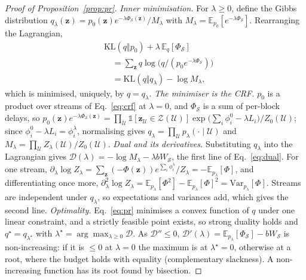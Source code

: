 \begin{proof}[Proof of Proposition~\ref{prop:pr}]
\emph{Inner minimisation.} For $\lambda\ge0$, define the Gibbs distribution
$q_\lambda(\bm{z})=p_0(\bm{z})e^{-\lambda\Phi_\mathcal{S}(\bm{z})}/M_\lambda$ with $M_\lambda=\mathbb{E}_{p_0}[e^{-\lambda\Phi_\mathcal{S}}]$.
Rearranging the Lagrangian,
\[
\begin{aligned}
&\mathrm{KL}(q\Vert p_0)+\lambda\,\mathbb{E}_q[\Phi_\mathcal{S}]\\
&\quad=\textstyle\sum_{\bm{z}}q\log\big(q/(p_0e^{-\lambda\Phi_\mathcal{S}})\big)\\
&\quad=\mathrm{KL}(q\Vert q_\lambda)-\log M_\lambda ,
\end{aligned}
\]
which is minimised, uniquely, by $q=q_\lambda$.
\emph{The minimiser is the CRF.} $p_0$ is a product over streams of Eq.~\eqref{eq:crf} at $\lambda=0$, and
$\Phi_\mathcal{S}$ is a sum of per-block delays, so
$p_0(\bm{z})e^{-\lambda\Phi_\mathcal{S}(\bm{z})}=\prod_{\mathcal{U}}\mathds{1}[\bm{z}_{\mathcal{U}}\in\mathcal{Z}(\mathcal{U})]\exp\big(\sum_i\phi^0_i-\lambda L_i\big)/Z_0(\mathcal{U})$;
since $\phi^0_i-\lambda L_i=\phi^\lambda_i$, normalising gives $q_\lambda=\prod_{\mathcal{U}}p_\lambda(\cdot\mid\mathcal{U})$ and
$M_\lambda=\prod_{\mathcal{U}}Z_\lambda(\mathcal{U})/Z_0(\mathcal{U})$.
\emph{Dual and its derivatives.} Substituting $q_\lambda$ into the Lagrangian gives
$\mathcal{D}(\lambda)=-\log M_\lambda-\lambda bW_\mathcal{S}$, the first line of Eq.~\eqref{eq:dual}. For one stream,
$\partial_\lambda\log Z_\lambda=\sum_{\bm{z}}(-\Phi(\bm{z}))e^{\sum_i\phi^\lambda_i}/Z_\lambda=-\mathbb{E}_{p_\lambda}[\Phi]$, and
differentiating once more, $\partial^2_\lambda\log Z_\lambda=\mathbb{E}_{p_\lambda}[\Phi^2]-\mathbb{E}_{p_\lambda}[\Phi]^2=\mathrm{Var}_{p_\lambda}[\Phi]$.
Streams are independent under $q_\lambda$, so expectations and variances add, which gives the second line.
\emph{Optimality.} Eq.~\eqref{eq:pr} minimises a convex function of $q$ under one linear constraint, and a strictly
feasible point exists, so strong duality holds and $q^\star=q_{\lambda^\star}$ with $\lambda^\star=\arg\max_{\lambda\ge0}\mathcal{D}$.
As $\mathcal{D}''\le0$, $\mathcal{D}'(\lambda)=\mathbb{E}_{p_\lambda}[\Phi_\mathcal{S}]-bW_\mathcal{S}$ is non-increasing: if it
is $\le0$ at $\lambda=0$ the maximum is at $\lambda^\star=0$, otherwise at a root, where the budget holds with equality
(complementary slackness). A non-increasing function has its root found by bisection.
\end{proof}

